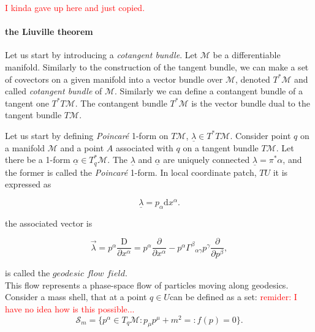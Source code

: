 \documentclass[11pt,a4paper,headinclude=true,DIV=14,BCOR=8mm,chapterprefix,listof=totoc,twoside,openright,abstracton]{scrbook}
\begin{document}
\textcolor{red}{I kinda gave up here and just copied.}


\paragraph{the Liuville theorem}

Let us start by introducing a \textit{cotangent bundle}. Let $\mathcal{M}$ be a differentiable manifold. Similarly to the construction of the tangent bundle, we can make a set of covectors on a given manifold into a vector bundle over $\mathcal{M}$, denoted $T^*\mathcal{M}$ and called \textit{cotangent bundle} of $\mathcal{M}$.  Similarly we can define a contangent bundle of a tangent one $T^*T\mathcal{M}$. The contangent bundle $T^*\mathcal{M}$ is the vector bundle dual to the tangent bundle $T\mathcal{M}$. 

Let us start by defining \textit{Poincar\'e} 1-form on $T\mathcal{M}$, $\underline{\lambda}\in T^* T\mathcal{M}$. Consider point $q$ on a manifold $\mathcal{M}$ and a point $A$ associated with $q$ on a tangent bundle $T\mathcal{M}$. Let there be a 1-form $\underline{\alpha}\in T^* _q\mathcal{M}$. The $\underline{\lambda}$ and $\underline{\alpha}$ are uniquely connected $\underline{\lambda} = \pi^* \alpha$, and the former is called the \textit{Poincar\'e} 1-form. In local coordinate patch, $TU$ it is expressed as

\begin{equation}
    \underline{\lambda} = p_{\alpha} \text{d}x^{\alpha}.
\end{equation}

the associated vector is 

\begin{equation}
    \vec{\lambda} = p^{\alpha} \frac{\text{D}}{\partial x^{\alpha}} = p^{\alpha}\frac{\partial}{\partial x^{\alpha}} - p^{\alpha}{\Gamma^{\beta}}_{\alpha\gamma}p^{\gamma}\frac{\partial}{\partial p^{\beta}},
\end{equation}

is called the $\textit{geodesic flow field}$. \\
This flow represents a phase-space flow of particles moving along geodesics. \\

Consider a mass shell, that at a point $q\in U$can be defined as a set:
\textcolor{red}{remider: I have no idea how is this possible...}
\begin{equation}
    \mathcal{S}_m = \big\{ p^{\alpha}\in T_q\mathcal{M}: p_{\mu}p^{\mu}+m^2 =:f(p) = 0 \big\}.
\end{equation}
\end{document}
